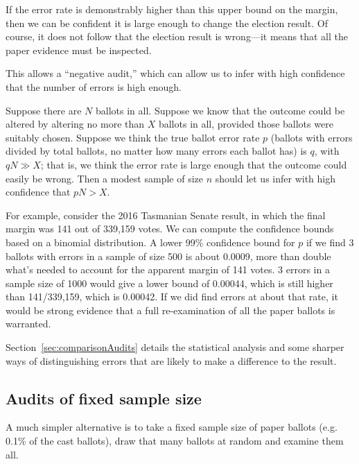 \documentclass[10pt,a4paper]{article}
\newcommand{\VTNote}[1]{}
\newcommand{\longVersion}[1]{#1}
\newcommand{\longVersion}[1]{}
\begin{document}
If the error rate is demonstrably higher than this upper bound on the margin, then we can be confident it is large enough to change the election result. Of course, it does not follow that the election result is wrong---it means that all the paper evidence must be inspected.  

This allows a ``negative audit,'' which can allow us to infer with high confidence that the number of errors is high enough.   

Suppose there are $N$ ballots in all.
Suppose we know that the outcome could be altered by altering no more than $X$ ballots in all, provided those ballots were suitably chosen.  Suppose
we think the true ballot error rate $p$ (ballots with errors divided by total ballots, no matter how many errors each ballot has) is $q$, with $qN \gg X$; that is, we think the error rate is large enough that the outcome could easily be wrong.  Then a modest sample
of size $n$ should let us infer with high confidence that $pN > X$. 

For example, consider the 2016 Tasmanian Senate result, in which the final margin was 141 out of 339,159 votes.  We can compute the confidence bounds based on a binomial distribution.  A lower 99\% confidence bound for $p$ if we find 3 ballots with errors in a sample of size 500 is about 0.0009, more than double
what's needed to account for the apparent margin of 141 votes. 3 errors in a sample size of 1000 would give a lower bound of 0.00044, which is still higher than
141/339,159, which is 0.00042.  If we did find errors at about that rate, it would be strong evidence that a full re-examination of all the paper ballots is warranted.


\longVersion{Section~\ref{sec:comparisonAudits} details the statistical analysis and some sharper ways of distinguishing errors that are likely to make a difference to the result.  \VTNote{Actually I'm not sure it does.  Not sure there are any useful sharper distinctions.  Are the stats just binomial bounds again?}}

\subsection{Audits of fixed sample size}
A much simpler alternative is to
take a fixed sample size of paper ballots (e.g. 0.1\% of the cast ballots), draw that
many ballots at random and examine them all.
\end{document}
